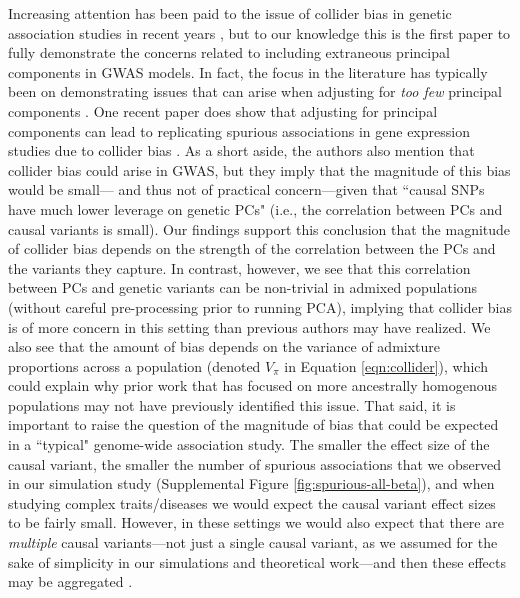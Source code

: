 \documentclass[12pt]{article}
\begin{document}
Increasing attention has been paid to the issue of collider bias in genetic association studies in recent years \citep{aschard2015, day2016, cai2022, hemani2022}, but to our knowledge this is the first paper to fully demonstrate the concerns related to including extraneous principal components in GWAS models.
In fact, the focus in the literature has typically been on demonstrating issues that can arise when adjusting for \textit{too few} principal components \citep{eigenstrat, kang2010, Yao2022}. %
One recent paper does show that adjusting for principal components can lead to replicating spurious associations in gene expression studies due to collider bias \citep{dahl2019}.
As a short aside, the authors also mention that collider bias could arise in GWAS, but they imply that the magnitude of this bias would be small--- and thus not of practical concern---given that ``causal SNPs have much lower leverage on genetic PCs" (i.e., the correlation between PCs and causal variants is small).  
Our findings support this conclusion that the magnitude of collider bias depends on the strength of the correlation between the PCs and the variants they capture.
In contrast, however, we see that this correlation between PCs and genetic variants can be non-trivial in admixed populations (without careful pre-processing prior to running PCA), implying that collider bias is of more concern in this setting than previous authors may have realized.
We also see that the amount of bias depends on the variance of admixture proportions across a population (denoted $V_\pi$ in Equation \ref{eqn:collider}), which could explain why prior work that has focused on more ancestrally homogenous populations may not have previously identified this issue.
That said, it is important to raise the question of the magnitude of bias that could be expected in a ``typical" genome-wide association study. 
The smaller the effect size of the causal variant, the smaller the number of spurious associations that we observed in our simulation study (Supplemental Figure \ref{fig:spurious-all-beta}), and when studying complex traits/diseases we would expect the causal variant effect sizes to be fairly small.
However, in these settings we would also expect that there are \textit{multiple} causal variants---not just a single causal variant, as we assumed for the sake of simplicity in our simulations and theoretical work---and then these effects may be aggregated \citep{di2011}. 
\end{document}
